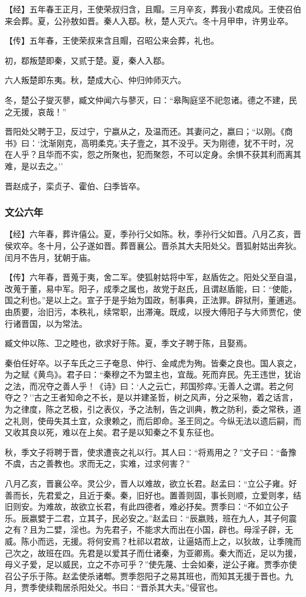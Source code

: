 \documentclass[]{article}
\begin{document}
【经】五年春王正月，王使荣叔归含，且賵。三月辛亥，葬我小君成风。王使召伯来会葬。夏，公孙敖如晋。秦人入鄀。秋，楚人灭六。冬十月甲申，许男业卒。

【传】五年春，王使荣叔来含且賵，召昭公来会葬，礼也。

初，鄀叛楚即秦，又贰于楚。夏，秦人入鄀。

六人叛楚即东夷。秋，楚成大心、仲归帅师灭六。

冬，楚公子燮灭蓼，臧文仲闻六与蓼灭，曰：``皋陶庭坚不祀忽诸。德之不建，民之无援，哀哉！''

晋阳处父聘于卫，反过宁，宁嬴从之，及温而还。其妻问之，嬴曰；``以刚。《商书》曰：`沈渐刚克，高明柔克。'夫子壹之，其不没乎。天为刚德，犹不干时，况在人乎？且华而不实，怨之所聚也，犯而聚怨，不可以定身。余惧不获其利而离其难，是以去之。''

晋赵成子，栾贞子、霍伯、臼季皆卒。

\hypertarget{header-n1110}{%
\subsubsection{文公六年}\label{header-n1110}}

【经】六年春，葬许僖公。夏，季孙行父如陈。秋，季孙行父如晋。八月乙亥，晋侯欢卒。冬十月，公子遂如晋。葬晋襄公。晋杀其大夫阳处父。晋狐射姑出奔狄。闰月不告月，犹朝于庙。

【传】六年春，晋蒐于夷，舍二军。使狐射姑将中军，赵盾佐之。阳处父至自温，改蒐于董，易中军。阳子，成季之属也，故党于赵氏，且谓赵盾能，曰：``使能，国之利也。''是以上之。宣子于是乎始为国政，制事典，正法罪。辟狱刑，董逋逃。由质要，治旧污，本秩礼，续常职，出滞淹。既成，以授大傅阳子与大师贾佗，使行诸晋国，以为常法。

臧文仲以陈、卫之睦也，欲求好于陈。夏，季文子聘于陈，且娶焉。

秦伯任好卒。以子车氏之三子奄息、仲行、金咸虎为殉。皆秦之良也。国人哀之，为之赋《黄鸟》。君子曰：``秦穆之不为盟主也，宜哉。死而弃民。先王违世，犹诒之法，而况夺之善人乎！《诗》曰：`人之云亡，邦国殄瘁。'无善人之谓。若之何夺之？''古之王者知命之不长，是以并建圣哲，树之风声，分之采物，着之话言，为之律度，陈之艺极，引之表仪，予之法制，告之训典，教之防利，委之常秩，道之礼则，使毋失其土宜，众隶赖之，而后即命。圣王同之。今纵无法以遗后嗣，而又收其良以死，难以在上矣。君子是以知秦之不复东征也。

秋，季文子将聘于晋，使求遭丧之礼以行。其人曰：``将焉用之？''文子曰：``备豫不虞，古之善教也。求而无之，实难，过求何害？''

八月乙亥，晋襄公卒。灵公少，晋人以难故，欲立长君。赵孟曰：``立公子雍。好善而长，先君爱之，且近于秦。秦，旧好也。置善则固，事长则顺，立爱则孝，结旧则安。为难故，故欲立长君，有此四德者，难必抒矣。贾季曰：``不如立公子乐。辰嬴嬖于二君，立其子，民必安之。''赵孟曰：``辰嬴贱，班在九人，其子何震之有？且为二嬖，淫也。为先君子，不能求大而出在小国，辟也。母淫子辟，无威。陈小而远，无援。将何安焉？杜祁以君故，让逼姞而上之，以狄故，让季隗而己次之，故班在四。先君是以爱其子而仕诸秦，为亚卿焉。秦大而近，足以为援，母义子爱，足以威民，立之不亦可乎？''使先蔑、士会如秦，逆公子雍。贾季亦使召公子乐于陈。赵孟使杀诸郫。贾季怨阳子之易其班也，而知其无援于晋也。九月，贾季使续鞫居杀阳处父。书曰：``晋杀其大夫。''侵官也。
\end{document}

